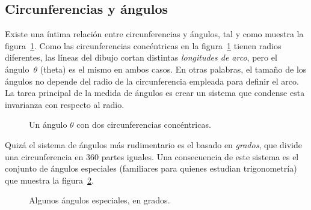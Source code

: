   \subsection{Circunferencias y ángulos} %
  \label{sec:circles_and_angles}

Existe una íntima relación entre circunferencias y ángulos, tal y como muestra la figura~\ref{fig:angle_arclength}. Como las circunferencias concéntricas en la figura~\ref{fig:angle_arclength} tienen radios diferentes, las líneas del dibujo cortan distintas \emph{longitudes de arco}, pero el ángulo~$\theta$ (theta) es el mismo en ambos casos. En otras palabras, el tamaño de los ángulos no depende del radio de la circunferencia empleada para definir el arco. La tarea principal de la medida de ángulos es crear un sistema que condense esta invarianza con respecto al radio.

\begin{figure}
\begin{center}
\end{center}
\caption{Un ángulo $\theta$ con dos circunferencias concéntricas.\label{fig:angle_arclength}}
\end{figure}

Quizá el sistema de ángulos más rudimentario es el basado en \emph{grados}, que divide una circunferencia en 360 partes iguales. Una consecuencia de este sistema es el conjunto de ángulos especiales (familiares para quienes estudian trigonometría) que muestra la figura~\ref{fig:degree_angles}.

\begin{figure}
\begin{center}
\end{center}
\caption{Algunos ángulos especiales, en grados.\label{fig:degree_angles}}
\end{figure}


